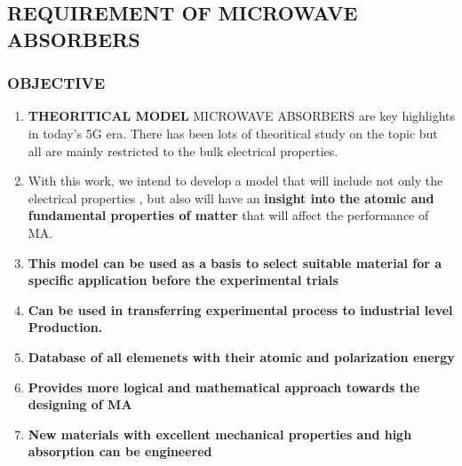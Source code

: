\documentclass[11pt,aspect ratio=169]{beamer}
\begin{document}
\subsection{REQUIREMENT OF MICROWAVE ABSORBERS}
	\begin{frame}[t]
		\frametitle{OBJECTIVE}
		\scriptsize
	\begin{minipage}[T]{0.6\textwidth}
		\begin{enumerate}[t]
			
			\item \textbf{THEORITICAL MODEL}	MICROWAVE ABSORBERS are key highlights in today's 5G era. There has been lots of theoritical study on the topic but all are mainly restricted to the bulk electrical properties.
			\item With this work, we intend to develop a model that will include not only the electrical properties , but also will have an\textbf{ insight into the atomic and fundamental properties of matter} that will affect the performance of MA.
			\item \textbf{This model can be used as a basis to select suitable material for a specific application before the experimental trials }
			\item  \textbf{Can be used in transferring experimental process to industrial level Production.}
			\item \textbf{Database of all elemenets with their atomic and polarization energy}
			\item \textbf{ Provides more logical and mathematical approach towards the designing of MA}
			\item \textbf{New materials with excellent mechanical properties and high absorption can be engineered } 
	
			
		\end{enumerate}
	\end{minipage}
	\begin{minipage}{0.4\textwidth}
\end{minipage}
	\end{frame}
\end{document}
